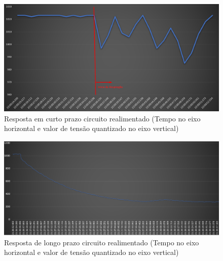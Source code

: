 \begin{figure}[h!]
	\begin{center}
		\includegraphics[width=1\linewidth]{images/RespostaCircuitoRealimentado.png}
		\caption{Resposta em curto prazo circuito realimentado (Tempo no eixo horizontal e valor de tensão quantizado no eixo vertical)}
		\label{fig:RespostaCircuitoRealimentado}
	\end{center}
\end{figure}

\begin{figure}[h!]
	\begin{center}
		\includegraphics[width=1\linewidth]{images/DecaimentoRespiracaoMascara.png}
		\caption{Resposta de longo prazo circuito realimentado (Tempo no eixo horizontal e valor de tensão quantizado no eixo vertical)}
		\label{fig:RespostaCircuitoRealimentadoLongoPrazo}
	\end{center}
\end{figure}


 
 